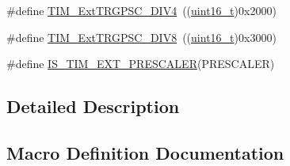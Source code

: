 \begin{DoxyCompactItemize}
\item 
\#define \hyperlink{group___t_i_m___external___trigger___prescaler_ga1de0031af7654fac2f29705f1da146c6}{T\+I\+M\+\_\+\+Ext\+T\+R\+G\+P\+S\+C\+\_\+\+D\+I\+V4}~((\hyperlink{_p_e___types_8h_a1f1825b69244eb3ad2c7165ddc99c956}{uint16\+\_\+t})0x2000)
\item 
\#define \hyperlink{group___t_i_m___external___trigger___prescaler_gac2fe5014d69a93ce0a22b9f3f5a7d19a}{T\+I\+M\+\_\+\+Ext\+T\+R\+G\+P\+S\+C\+\_\+\+D\+I\+V8}~((\hyperlink{_p_e___types_8h_a1f1825b69244eb3ad2c7165ddc99c956}{uint16\+\_\+t})0x3000)
\item 
\#define \hyperlink{group___t_i_m___external___trigger___prescaler_ga615587e6aae397d9fe8166004e7324f2}{I\+S\+\_\+\+T\+I\+M\+\_\+\+E\+X\+T\+\_\+\+P\+R\+E\+S\+C\+A\+L\+ER}(P\+R\+E\+S\+C\+A\+L\+ER)
\end{DoxyCompactItemize}


\subsection{Detailed Description}


\subsection{Macro Definition Documentation}
